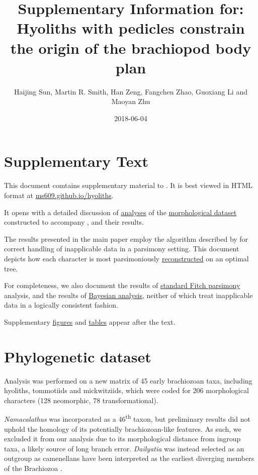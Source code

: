 \documentclass[openany]{book}
\title{Supplementary Information for: \newline\newline Hyoliths with pedicles
constrain the origin of the brachiopod body plan}
\author{Haijing Sun, Martin R. Smith, Han Zeng, Fangchen Zhao, Guoxiang Li and
Maoyan Zhu}
\date{2018-06-04}
\theoremstyle{definition}
\theoremstyle{definition}
\theoremstyle{definition}
\theoremstyle{remark}
\begin{document}
\maketitle

{
\setcounter{tocdepth}{1}
\tableofcontents
}
\chapter*{Supplementary Text}\label{supplementary-text}

This document comtains supplementary material to
\citet{Sun2018Hyolithswith}. It is best viewed in HTML format at
\href{https://ms609.github.io/hyoliths/}{ms609.github.io/hyoliths}.

It opens with a detailed discussion of
\protect\hyperlink{treesearch}{analyses} of the
\protect\hyperlink{dataset}{morphological dataset} constructed to
accompany \citet{Sun2018Hyolithswith}, and their results.

The results presented in the main paper employ the algorithm described
by \citet{Brazeau2018} for correct handling of inapplicable data in a
parsimony setting. This document depicts how each character is most
parsimoniously \protect\hyperlink{reconstructions}{reconstructed} on an
optimal tree.

For completeness, we also document the results of
\protect\hyperlink{fitch}{standard Fitch parsimony} analysis, and the
results of \protect\hyperlink{bayesian}{Bayesian analysis}, neither of
which treat inapplicable data in a logically consistent fashion.

Supplementary \protect\hyperlink{figures}{figures} and
\protect\hyperlink{table}{tables} appear after the text.

\hypertarget{dataset}{\chapter{Phylogenetic dataset}\label{dataset}}

Analysis was performed on a new matrix of 45 early brachiozoan taxa,
including hyoliths, tommotiids and mickwitziids, which were coded for
206 morphological characters (128 neomorphic, 78 transformational).

\emph{Namacalathus} was incorporated as a 46\textsuperscript{th} taxon,
but preliminary results did not uphold the homology of its potentially
brachiozoan-like features. As such, we excluded it from our analysis due
to its morphological distance from ingroup taxa, a likely source of long
branch error. \emph{Dailyatia} was instead selected as an outgroup as
camenellans have been interpreted as the earliest diverging members of
the Brachiozoa \citep{Skovsted2015Theearly, Zhao2017}.
\end{document}
